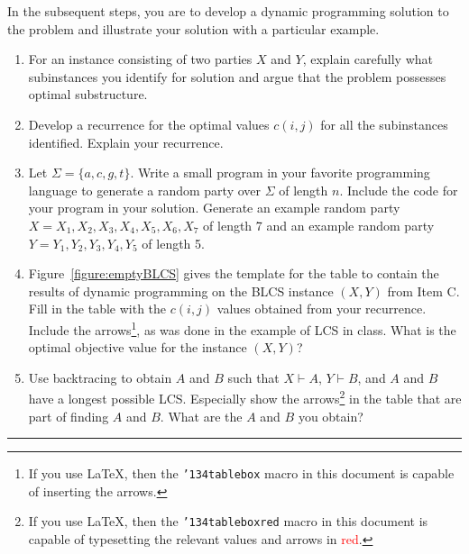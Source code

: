 \documentclass[11pt,twoside]{article}
\newcounter{problem}
\newcommand{\solution}{\bigskip\hrule\bigskip}
\newcommand{\describes}{\vdash}
\begin{document}
In the subsequent steps,
you are to develop a dynamic programming solution to the problem
and illustrate your solution with a particular example.

{\bfseries
\begin{enumerate}

\item
For an instance consisting of two parties $X$ and $Y$,
explain carefully what subinstances
you identify for solution
and argue that the problem possesses optimal substructure.

\item
Develop a recurrence for the optimal values $c(i,j)$
for all the subinstances identified.
Explain your recurrence.

\item
Let $\Sigma=\{a,c,g,t\}$.
Write a small program in your favorite programming language
to generate a random party over $\Sigma$ of length $n$.
Include the code for your program in your solution.
Generate an example random party $X=X_1,X_2,X_3,X_4,X_5,X_6,X_7$
of length 7
and an example random party $Y=Y_1,Y_2,Y_3,Y_4,Y_5$
of length 5.

\item
Figure~\ref{figure:emptyBLCS}
gives the template for the table
to contain the results of dynamic programming
on the BLCS instance $(X,Y)$ from Item C.
Fill in the table with the $c(i,j)$ values
obtained from your recurrence.
Include the arrows\footnote{%
If you use \LaTeX,
then the \texttt{{\char'134}tablebox} macro in this document
is capable of inserting the arrows.
},
as was done in the example of LCS in class.
What is the optimal objective value for the instance $(X,Y)$?

\item
Use backtracing to obtain $A$ and $B$
such that $X\describes A$, $Y\describes B$,
and $A$ and $B$ have a longest possible LCS.
Especially show the arrows\footnote{%
If you use \LaTeX,
then the \texttt{{\char'134}tableboxred} macro in this document is
capable of typesetting the relevant values and arrows
in \textcolor{red}{red}.
}
in the table that are
part of finding $A$ and $B$.
What are the $A$ and $B$ you obtain?

\end{enumerate}
}

\solution

\end{document}
